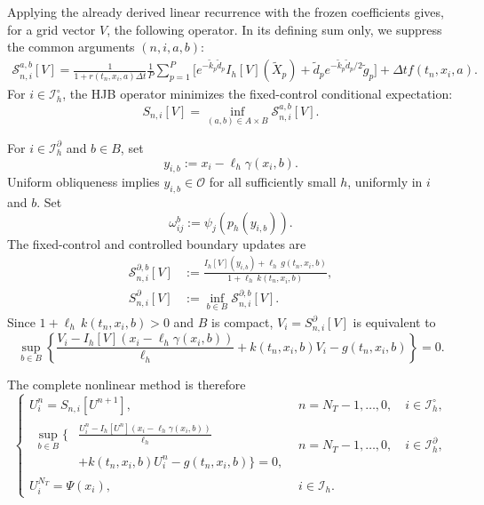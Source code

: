 \documentclass[10pt,a4paper]{amsart}
\newcommand{\cO}{\mathcal{O}}
\newcommand{\cS}{\mathcal{S}}
\newcommand{\dt}{\Delta t}
\begin{document}
	Applying the already derived linear recurrence with the frozen coefficients gives, for a grid vector $V$, the following operator.  In its defining sum only, we suppress the common arguments $(n,i,a,b)$:
	\begin{equation}
		\begin{aligned}
			\cS_{n,i}^{a,b}[V]
			=\frac{1}{1+r(t_n,x_i,a)\dt}\frac1P\sum_{p=1}^P
			\Big[e^{-\widetilde k_p\widetilde d_p}I_h[V](\widetilde X_p)
			+\widetilde d_p e^{-\widetilde k_p\widetilde d_p/2}\widetilde g_p\Big]
			+\dt f(t_n,x_i,a).
		\end{aligned}
		\label{eq:fixed-operator}
	\end{equation}
	For $i\in\mathcal I_h^\circ$, the HJB operator minimizes the fixed-control conditional expectation:
	\begin{equation}
		S_{n,i}[V]=\inf_{(a,b)\in A\times B}\cS_{n,i}^{a,b}[V].
		\label{eq:HJB-operator}
	\end{equation}
	
	For $i\in\mathcal I_h^\partial$ and $b\in B$, set
	\[
	y_{i,b}:=x_i-\ell_h\gamma(x_i,b).
	\]
	Uniform obliqueness implies $y_{i,b}\in\cO$ for all sufficiently small $h$,
	uniformly in $i$ and $b$.  Set
	\[
	\omega_{ij}^b:=\psi_j(p_h(y_{i,b})).
	\]
	The fixed-control and controlled boundary updates are
	\begin{align}
		\cS_{n,i}^{\partial,b}[V]
		&:=\frac{I_h[V](y_{i,b})+\ell_h\,g(t_n,x_i,b)}
		{1+\ell_h\,k(t_n,x_i,b)},
		\label{eq:fixed-boundary-map}\\
		S_{n,i}^{\partial}[V]&:=\inf_{b\in B}\cS_{n,i}^{\partial,b}[V].
		\label{eq:controlled-boundary-map}
	\end{align}
	Since $1+\ell_h\,k(t_n,x_i,b)>0$ and $B$ is compact,
	$V_i=S_{n,i}^{\partial}[V]$ is equivalent to
	\begin{equation}
		\sup_{b\in B}
		\left\{
		\frac{V_i-I_h[V](x_i-\ell_h\gamma(x_i,b))}{\ell_h}
		+k(t_n,x_i,b)V_i-g(t_n,x_i,b)
		\right\}=0.
		\label{eq:discrete-boundary-residual}
	\end{equation}
	
	The complete nonlinear method is therefore
	\begin{equation}
		\begin{cases}
			U_i^n=S_{n,i}[U^{n+1}],
			&n=N_T-1,\ldots,0,\quad i\in\mathcal I_h^\circ,\\[7pt]
			\begin{aligned}
				\sup_{b\in B}\biggl\{&
				\frac{U_i^n-I_h[U^n](x_i-\ell_h\gamma(x_i,b))}{\ell_h}\\[-2pt]
				&+k(t_n,x_i,b)U_i^n-g(t_n,x_i,b)
				\biggr\}=0,
			\end{aligned}
			&n=N_T-1,\ldots,0,\quad i\in\mathcal I_h^\partial,\\[10pt]
			U_i^{N_T}=\Psi(x_i),&i\in\mathcal I_h .
		\end{cases}
		\label{eq:scheme}
	\end{equation}
	
\end{document}

